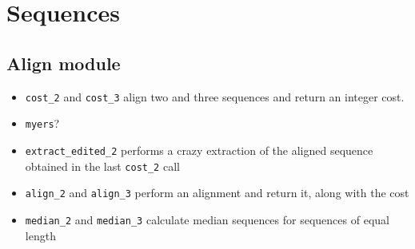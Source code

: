 \documentclass{article}
\begin{document}
\section{Sequences}
\label{sec:sequence}


\subsection{Align module}
\label{sec:align-module}

\begin{itemize}
\item \texttt{cost\_2} and \texttt{cost\_3} align two and three sequences and
  return an integer cost.
\item \texttt{myers}?
\item \texttt{extract\_edited\_2} performs a crazy extraction of the aligned
  sequence obtained in the last \texttt{cost\_2} call
\item \texttt{align\_2} and \texttt{align\_3} perform an alignment and return
  it, along with the cost
\item \texttt{median\_2} and \texttt{median\_3} calculate median sequences for
  sequences of equal length
\end{itemize}
\end{document}
